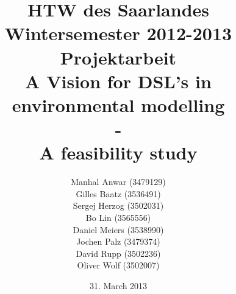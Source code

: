 


\title{%
\large HTW des Saarlandes\\
Wintersemester 2012-2013\\
Projektarbeit\\[10mm]
{\LARGE A Vision for DSL's in environmental modelling}\\
{\LARGE -}\\
{\LARGE A feasibility study}\\[10mm]
}

\author{%
Manhal Anwar (3479129)\\[1mm]
Gilles Baatz (3536491)\\[1mm]
Sergej Herzog (3502031)\\[1mm]
Bo Lin (3565556)\\[1mm]
Daniel Meiers (3538990)\\[1mm]
Jochen Palz (3479374)\\[1mm]
David Rupp (3502236)\\[1mm]
Oliver Wolf (3502007)\\[1mm]
}

\date{31. March 2013}



\maketitle

\tableofcontents
\listoffigures


 










\printbibliography


